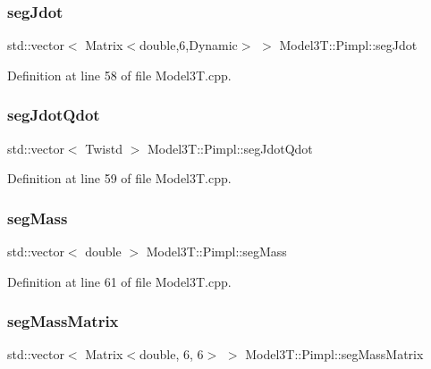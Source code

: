 \subsubsection{\texorpdfstring{seg\+Jdot}{segJdot}}
{\footnotesize\ttfamily std\+::vector$<$ Matrix$<$double,6,Dynamic$>$ $>$ Model3\+T\+::\+Pimpl\+::seg\+Jdot}



Definition at line 58 of file Model3\+T.\+cpp.

\hypertarget{structModel3T_1_1Pimpl_a504aa134750da2f42dfe8fa7e431b9cd}{}\label{structModel3T_1_1Pimpl_a504aa134750da2f42dfe8fa7e431b9cd} 
\subsubsection{\texorpdfstring{seg\+Jdot\+Qdot}{segJdotQdot}}
{\footnotesize\ttfamily std\+::vector$<$ Twistd $>$ Model3\+T\+::\+Pimpl\+::seg\+Jdot\+Qdot}



Definition at line 59 of file Model3\+T.\+cpp.

\hypertarget{structModel3T_1_1Pimpl_a96656676ff3aa9cddb99f58f453786c7}{}\label{structModel3T_1_1Pimpl_a96656676ff3aa9cddb99f58f453786c7} 
\subsubsection{\texorpdfstring{seg\+Mass}{segMass}}
{\footnotesize\ttfamily std\+::vector$<$ double $>$ Model3\+T\+::\+Pimpl\+::seg\+Mass}



Definition at line 61 of file Model3\+T.\+cpp.

\hypertarget{structModel3T_1_1Pimpl_a7d3d20f64bbe278275b6e74a49ebf9f6}{}\label{structModel3T_1_1Pimpl_a7d3d20f64bbe278275b6e74a49ebf9f6} 
\subsubsection{\texorpdfstring{seg\+Mass\+Matrix}{segMassMatrix}}
{\footnotesize\ttfamily std\+::vector$<$ Matrix$<$double, 6, 6$>$ $>$ Model3\+T\+::\+Pimpl\+::seg\+Mass\+Matrix}



